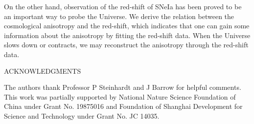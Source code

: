 \documentclass[a4paper,preprint]{revtex4}
\begin{document}
On the other hand, observation of the red-shift of SNeIa has been
proved to be an important way to probe the
Universe\cite{Perlmutter}. We derive the relation between the
cosmological anisotropy and the red-shift, which indicates that
one can gain some information about the anisotropy by fitting the
red-shift data. When the Universe slows down or contracts, we may
reconstruct the anisotropy through the red-shift data.



\vspace{0.8cm} \noindent ACKNOWLEDGMENTS

The authors thank Professor P Steinhardt and J Barrow for helpful
comments. This work was partially supported by National Nature
Science Foundation of China under Grant No. 19875016 and
Foundation of Shanghai Development for Science and Technology
under Grant No. JC 14035.
\end{document}
